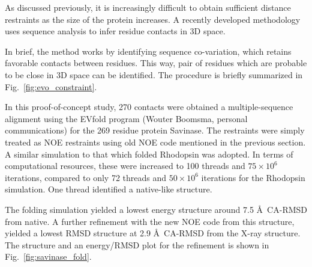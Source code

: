 As discussed previously, it is increasingly difficult to obtain sufficient distance restraints as the size of the protein increases.
A recently developed methodology uses sequence analysis to infer residue contacts in 3D space. 

In brief, the method works by identifying sequence co-variation, which retains favorable contacts between residues.
This way, pair of residues which are probable to be close in 3D space can be identified.
The procedure is briefly summarized in Fig.~\ref{fig:evo_constraint}.

In this proof-of-concept study, 270 contacts were obtained a multiple-sequence alignment using the EVfold program (Wouter Boomsma, personal communications) for the 269 residue protein Savinase.
The restraints were simply treated as NOE restraints using old NOE code mentioned in the previous section.
A similar simulation to that which folded Rhodopsin was adopted. 
In terms of computational resources, these were increased to 100 threads and $75 \times 10^6$ iterations, compared to only 72 threads and $50 \times 10^6$ iterations for the Rhodopsin simulation.
One thread identified a native-like structure.

The folding simulation yielded a lowest energy structure around 7.5 \AA~CA-RMSD from native. A further refinement with the new NOE code from this structure, yielded a lowest RMSD structure at 2.9 \AA~CA-RMSD from the X-ray structure.
The structure and an energy/RMSD plot for the refinement is shown in Fig.~\ref{fig:savinase_fold}.





